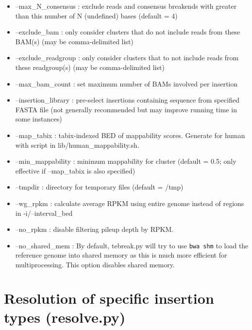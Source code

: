 \documentclass[letterpaper,11pt]{article}
\begin{document}
\begin{itemize}
\item --max\_N\_consensus : exclude reads and consensus breakends with greater than this number of N (undefined) bases (default = 4)
\item --exclude\_bam : only consider clusters that do not include reads from these BAM(s) (may be comma-delimited list)
\item --exclude\_readgroup : only consider clusters that to not include reads from these readgroup(s) (may be comma-delimited list)
\item --max\_bam\_count : set maximum number of BAMs involved per insertion
\item --insertion\_library : pre-select insertions containing sequence from specified FASTA file (not generally recommended but may improve running time in some instances)
\item --map\_tabix : tabix-indexed BED of mappability scores. Generate for human with script in lib/human\_mappability.sh.
\item --min\_mappability : minimum mappability for cluster (default = 0.5; only effective if --map\_tabix is also specified)
\item --tmpdir : directory for temporary files (default = /tmp)
\item --wg\_rpkm : calculate average RPKM using entire genome instead of regions in -i/--interval\_bed
\item --no\_rpkm : disable filtering pileup depth by RPKM.
\item --no\_shared\_mem : By default, tebreak.py will try to use \texttt{bwa shm} to load the reference genome into shared memory as this is much more efficient for multiprocessing. This option disables shared memory.

\end{itemize}


\section{Resolution of specific insertion types (resolve.py)}
\end{document}
